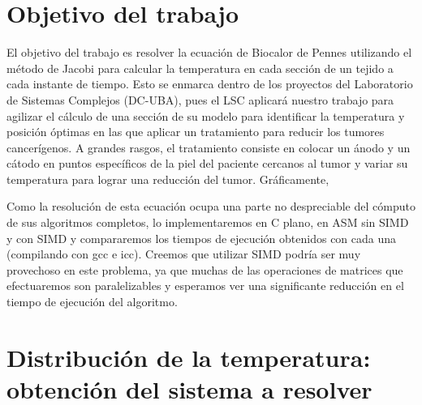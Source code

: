 \documentclass[a4paper]{article}
\begin{document}
\newtheorem{teo}{Teorema}[section]
\newtheorem{propo}{Proposici\'{o}n}[section]
\newtheorem{lema}{Lema}[section]
\newtheorem{coro}{Corolario}[section]
\newtheorem{defi}{Definici\'{o}n}[section]

\newpage
\setcounter{page}{1}
\pagestyle{plain}

\newpage


\newcommand{\Asig}{\ensuremath{\leftarrow}}
\newcommand{\AndY}{\ensuremath{\wedge}}
\newcommand{\Or}{\ensuremath{\vee}}
\newcommand{\Not}{\ensuremath{\neg}}
\newcommand{\NotEq}{\ensuremath{\neq}}
\newcommand{\MayorIg}{\ensuremath{\geq}}
\newcommand{\tabu}{\hspace*{0.7cm}}
\newcommand{\ctabu}{\hspace*{0.8cm}}
\newcommand{\htabu}{\hspace*{0.35cm}}
\newcommand{\moduloNombre}[1]{\textbf{#1}}

\section{Objetivo del trabajo}

El objetivo del trabajo es resolver la ecuación de Biocalor de Pennes utilizando el método de Jacobi para calcular la temperatura en cada sección de un tejido a cada instante de tiempo. Esto se enmarca dentro de los proyectos del Laboratorio de Sistemas Complejos (DC-UBA), pues el LSC aplicará nuestro trabajo para agilizar el cálculo de una sección de su modelo para identificar la temperatura y posición óptimas en las que aplicar un tratamiento para reducir los tumores cancerígenos. A grandes rasgos, el tratamiento consiste en colocar un ánodo y un cátodo en puntos específicos de la piel del paciente cercanos al tumor y variar su temperatura para lograr una reducción del tumor. Gráficamente,


Como la resolución de esta ecuación ocupa una parte no despreciable del cómputo de sus algoritmos completos, lo implementaremos en C plano, en ASM sin SIMD y con SIMD y compararemos los tiempos de ejecución obtenidos con cada una (compilando con gcc e icc). Creemos que utilizar SIMD podría ser muy provechoso en este problema, ya que muchas de las operaciones de matrices que efectuaremos son paralelizables y esperamos ver una significante reducción en el tiempo de ejecución del algoritmo.

\section{Distribuci\'on de la temperatura: obtención del sistema a resolver}
\end{document}
